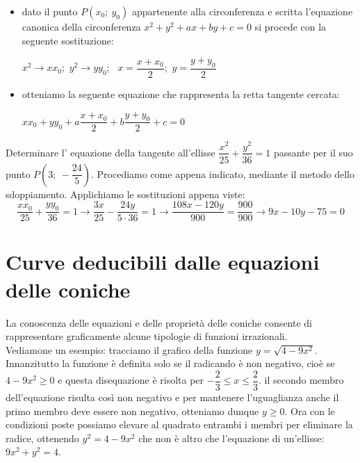 \begin{itemize} [noitemsep]
  \item   dato il punto $P( x_{0};~ y_{0} )$ appartenente alla 
circonferenza e scritta l'equazione canonica della circonferenza $ x^{2} + 
y^{2} +ax+by+c=0$ si procede con la seguente sostituzione:

$ x^{2} \longrightarrow x x_{0} $;~$ y^{2} \longrightarrow y y_{0}$;~
$x= \dfrac{x+x_{0}}{2} $;~$y= \dfrac{y+y_{0}}{2}$

  \item otteniamo la seguente equazione che rappresenta la retta 
tangente cercata:

  $x x_{0} +y y_{0}+a \dfrac{x+x_{0}}{2}  +b \dfrac{y+y_{0}}{2} +c=0$
\end{itemize}

\begin{esempio} Determinare l' equazione della tangente 
all'ellisse $ \dfrac{x^{2}}{25}+\dfrac{y^{2}}{36} =1$ passante per il suo 
punto $P\left(3;~-\dfrac{24}{5}\right)$. 
Procediamo come appena indicato, mediante il metodo dello sdoppiamento. 
Applichiamo le sostituzioni appena viste:
\[\dfrac{xx_{0}}{25} + \dfrac{yy_{0}}{36} = 1  \longrightarrow 
\dfrac{3x}{25} - \dfrac{24y}{5 \cdot 36} =1  \longrightarrow  
\dfrac{108x-120y}{900}=\dfrac{900}{900} \longrightarrow 9x-10y-75=0\]
\end{esempio}

\section{Curve deducibili dalle equazioni delle coniche}
\label{sec:coniche_curve_deducibili}

La conoscenza delle equazioni e delle proprietà delle coniche consente di 
rappresentare graficamente alcune tipologie di funzioni irrazionali.\\ 
Vediamone un esempio: tracciamo il grafico della funzione 
$y=\sqrt{4-9x^{2}}$. Innanzitutto la funzione è definita solo se il 
radicando è non negativo, cioè se $4-9x^{2}\geq0$ e questa disequazione è 
risolta per $ -\dfrac{2}{3}\leq x\leq \dfrac{2}{3}$. il secondo membro 
dell'equazione risulta così non negativo e per mantenere l'uguaglianza 
anche il primo membro deve essere non negativo, otteniamo dunque $ y\geq0 $. 
Ora con le condizioni poste possiamo elevare al quadrato entrambi i membri 
per eliminare la radice, ottenendo $ y^{2}=4-9x^{2} $ che non è altro che 
l'equazione di un'ellisse: $ 9x^{2}+y^{2}=4 $.

